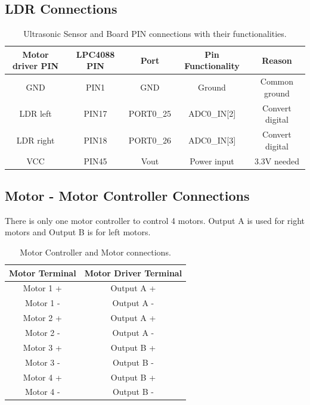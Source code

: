 \documentclass[12pt]{article}
\begin{document}
\subsection{LDR Connections}

\begin {table}[H]
\begin{center}
\begin{tabular}{|c|c|c|c|c|}
\hline
Motor driver PIN & LPC4088 PIN & Port & Pin Functionality & Reason \\\hline
GND & PIN1 & GND & Ground & Common ground \\\hline
LDR left  & PIN17 & PORT0\_25 & ADC0\_IN[2] & Convert digital\\\hline
LDR right & PIN18 & PORT0\_26 & ADC0\_IN[3] & Convert digital \\\hline
VCC & PIN45 & Vout & Power input & 3.3V needed \\\hline
\end{tabular}
\caption{Ultrasonic Sensor and Board PIN connections with their functionalities.}
\end{center}
\end{table}

\subsection{Motor - Motor Controller Connections}

There is only one motor controller to control 4 motors. Output A is used for right motors and Output B is for left motors.

\begin {table}[H]
\begin{center}
\begin{tabular}{|c|c|}
\hline
Motor Terminal & Motor Driver Terminal \\\hline
Motor 1 + & Output A + \\\hline
Motor 1 - & Output A - \\\hline
Motor 2 + & Output A + \\\hline
Motor 2 - & Output A - \\\hline
Motor 3 + & Output B + \\\hline
Motor 3 - & Output B - \\\hline
Motor 4 + & Output B + \\\hline
Motor 4 - & Output B - \\\hline
\end{tabular}
\caption{Motor Controller and Motor connections.}
\end{center}
\end{table}
\end{document}
